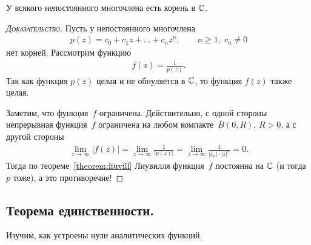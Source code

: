 \documentclass[../complex-analysis.tex]{subfiles}
\begin{document}
\begin{thm}
 У всякого непостоянного многочлена есть корень в $ \mathbb{C} $.
\end{thm}
\begin{proof}[\normalfont\textsc{Доказательство}]
 Пусть у непостоянного многочлена
 \begin{align*}
  p(z) = c_0 + c_1 z + \ldots + c_n z^{n}, \qquad n \geqslant 1,\; c_n \neq 0
 \end{align*}
 нет корней. Рассмотрим функцию
 \begin{align*}
  f(z) = \frac{1}{p(z)}.
 \end{align*} Так как функция $ p(z) $ целая и не обнуляется в $ \mathbb{C} $, то функция $ f(z) $ также целая.

 Заметим, что функция~$ f $ ограничена. Действительно, с одной стороны непрерывная функция~$ f $ ограничена на любом компакте~$ \overline B(0, R) $, $ R > 0 $, а с другой стороны
 \begin{align*}
  \lim_{z \to \infty} \left| f(z) \right| = \lim_{z \to \infty} \frac{1}{\left| p(z) \right|} = \lim_{z \to \infty} \frac{1}{\left| c_n \right| \cdot \left| z \right|^{n}} = 0.
 \end{align*} Тогда по теореме~\ref{theorem:liuvill} Лиувилля функция~$ f $ постоянна на $ \mathbb{C} $ (и тогда $ p $ тоже), а это противоречие!
\end{proof}

\subsection{Теорема единственности.}

Изучим, как устроены нули аналитических функций.
\end{document}

